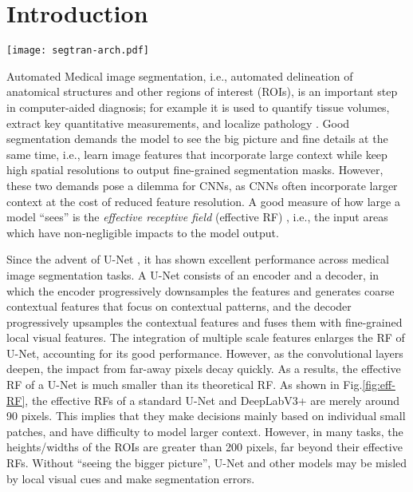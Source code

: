 \documentclass{article}
\begin{document}
\section{Introduction}
\begin{figure*}
\centering
  \texttt{[image: segtran-arch.pdf]}
  \label{fig:segtran-arch}
\end{figure*}

Automated Medical image segmentation, i.e., automated delineation of anatomical structures and other regions of interest (ROIs), is an important step in computer-aided diagnosis; for example it is used to quantify tissue volumes, extract key quantitative measurements, and localize pathology \cite{attention-unet-journal,refuge}. Good segmentation demands the model to see the big picture and fine details at the same time, i.e., learn image features that incorporate large context while keep high spatial resolutions to output fine-grained segmentation masks. However, these two demands pose a dilemma for CNNs, as CNNs often incorporate larger context at the cost of reduced feature resolution. A good measure of how large a model ``sees'' is the \emph{effective receptive field} (effective RF) \cite{eff-rf}, i.e., the input areas which have non-negligible impacts to the model output.

Since the advent of U-Net \cite{unet}, it has shown excellent performance across medical image segmentation tasks. A U-Net consists of an encoder and a decoder, in which the encoder progressively downsamples the features and generates coarse contextual features that focus on contextual patterns, and the decoder progressively upsamples the contextual features and fuses them with fine-grained local visual features. The integration of multiple scale features enlarges the RF of U-Net, accounting for its good performance. However, as the convolutional layers deepen, the impact from far-away pixels decay quickly. As a results, the effective RF of a U-Net is much smaller than its theoretical RF. As shown in Fig.\ref{fig:eff-RF}, the effective RFs of a standard U-Net and DeepLabV3+ are merely around 90 pixels. This implies that they make decisions mainly based on individual small patches, and have difficulty to model larger context. However, in many tasks, the heights/widths of the ROIs are greater than 200 pixels, far beyond their effective RFs.  Without ``seeing the bigger picture'', U-Net and other models may be misled by local visual cues and make segmentation errors. 
\end{document}
